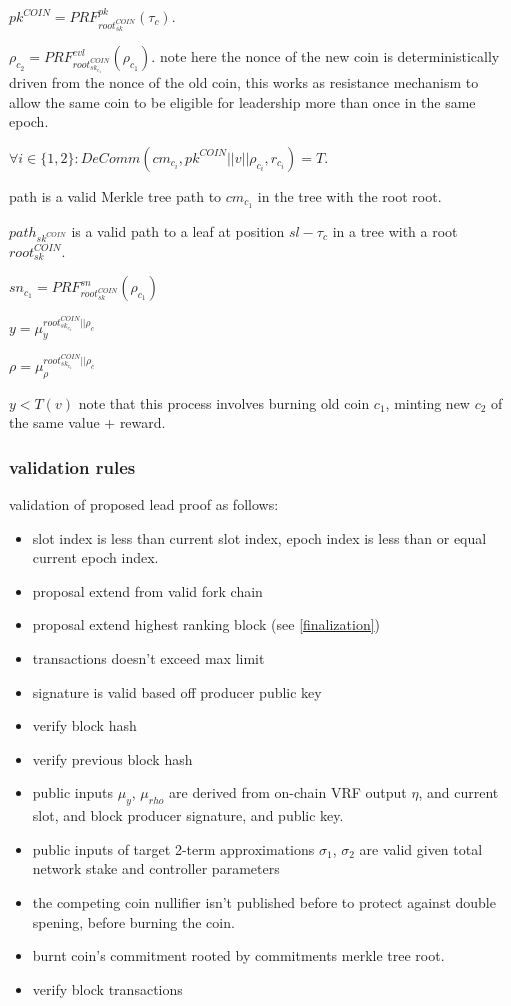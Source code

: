 \documentclass{article}
\begin{document}
 \item $pk^{COIN} = PRF_{root_{sk}^{COIN}}^{pk}(\tau_c)$.
 \item $\rho_{c_2}=PRF_{root_{sk_{c_1}}^{COIN}}^{evl}(\rho_{c_1})$.
 note here the nonce of the new coin is deterministically driven from the nonce of the old coin, this works as resistance mechanism to allow the same coin to be eligible for leadership more than once in the same epoch.
 \item $\forall i \in \{1,2\} : DeComm(cm_{c_i},pk^{COIN}||v||\rho_{c_i},r_{c_i})=T$.
 \item path is a valid Merkle tree path to $cm_{c_1}$ in the tree with the root root.
 \item $path_{sk^{COIN}}$ is a valid path to a leaf at position $sl-\tau_c$ in a tree with a root $root_{sk}^{COIN}$.
 \item $sn_{c_1}= PRF_{root_{sk}^{COIN}}^{sn}(\rho_{c_1})$
 \item $y = \mu_{y}^{root_{sk_{c_1}}^{COIN}||\rho_c}$
 \item $\rho = \mu_{\rho}^{root_{sk_{c_1}}^{COIN}||\rho_c}$
 \item $y< T(v)$
note that this process involves burning old coin $c_1$, minting new  $c_2$ of the same value + reward.

\subsubsection{ validation rules}

validation of proposed lead proof as follows:
\begin{itemize}
\item slot index is less than current slot index, epoch index is less than or equal current epoch index.
\item proposal extend from valid fork chain
\item proposal extend highest ranking block (see \ref{finalization})
\item transactions doesn't exceed max limit
\item signature is valid based off producer public key
\item verify block hash
\item verify previous block hash
\item public inputs $\mu_y$, $\mu_{rho}$ are derived from on-chain VRF output $\eta$, and current slot, and block producer signature, and public key.
\item public inputs of target 2-term approximations $\sigma_1$, $\sigma_2$ are valid given total network stake and controller parameters
\item the competing coin nullifier isn't published before to protect against double spening, before burning the coin.
\item burnt coin's commitment rooted by commitments merkle tree root.
\item verify block transactions

\end{itemize}
\end{document}
